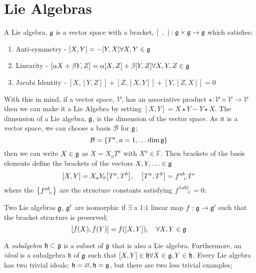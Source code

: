 \section{Lie Algebras}
A Lie algebra, $\mathfrak{g}$ is a vector space with a bracket, $\left[\,\,\,, \,\,\right] : \alge \times \alge \rightarrow \alge$ which satisfies;
\begin{enumerate}
\item Anti-symmetry - $\left[X, Y\right] = -\left[Y, X\right] \forall X, Y \in \alge$
\item Linearity - $\left[\alpha X + \beta Y, Z\right] = \alpha\left[X, Z\right] + \beta\left[Y, Z\right] \forall X, Y, Z \in \alge$
\item Jacobi Identity - $\left[X, [Y, Z]\right] + \left[Z, [X, Y]\right] + \left[Y, [Z, X]\right] = 0$
\end{enumerate}
With this in mind, if a vector space, $\mathcal{V}$, has an associative product $\star : \mathcal{V} \times \mathcal{V} \rightarrow \mathcal{V}$ then we can make it a Lie Algebra by setting $[X, Y] = X \star Y - Y \star X$. The dimension of a Lie algebra, $\mathfrak{g}$, is the dimension of the vector space. As it is a vector space, we can choose a basis $\mathcal{B}$ for $\mathfrak{g}$;
\begin{equation}
\mathcal{B} = \set{T^a, a = 1, \ldots \dim \alge}
\end{equation}
then we can write $X \in \mathfrak{g}$ as $X = X_a T^a$ with $X^a \in \mathbb{F}$. Then brackets of the basis elements define the brackets of the vectors $X, Y, \ldots \in \mathfrak{g}$
\begin{equation}
\left[X, Y\right] = X_a Y_b \left[T^a, T^b\right], \quad \left[T^a, T^b\right] = f\indices{^{ab}_{c}}T^c
\end{equation}
where the $\set{f\indices{^{ab}_{c}}}$ are the structure constants satisfying $f\indices{^{(ab)}_{c}} = 0$.
\begin{definitionbox}
Two Lie algebras $\mathfrak{g}$, $\mathfrak{g}^{\prime}$ are isomorphic if $\exists$ a $1$:$1$ linear map $f : \mathfrak{g} \rightarrow \mathfrak{g}^{\prime}$ such that the bracket structure is preserved;
\begin{equation}
\left[f(X), f(Y)\right] = f\left([X, Y]\right), \quad \forall X, Y \in \alge
\end{equation}
\end{definitionbox}
A \emph{subalgebra} $\mathfrak{h} \subset \mathfrak{g}$ is a subset of $\mathfrak{g}$ that is also a Lie algebra. Furthermore, an \emph{ideal} is a subalgebra $\mathfrak{h}$ of $\mathfrak{g}$ such that $[X, Y] \in \mathfrak{h} \forall X \in \mathfrak{g}, Y \in \mathfrak{h}$. Every Lie algebra has two trivial ideals; $\mathfrak{h} = \varnothing, \mathfrak{h} = \mathfrak{g}$, but there are two less trivial examples;
